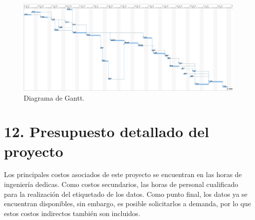 \documentclass[
11pt, %
]{charter}
\begin{document}
\begin{landscape}
  \centering
  \vspace*{\fill}
  \begin{figure}[htpb]
    \centering
    \includegraphics[height=.65\textheight]{./Figuras/gantt.jpg}
    \caption{Diagrama de Gantt.}
    \label{fig:diagGantt}
  \end{figure}
  \vfill
\end{landscape}


\section{12. Presupuesto detallado del proyecto}
\label{sec:presupuesto}

Los principales costos asociados de este proyecto se encuentran en las horas de ingeniería dedicas. Como costos secundarios, las horas de personal cualificado para la realización del etiquetado de los datos. Como punto final, los datos ya se encuentran disponibles, sin embargo, es posible solicitarlos a demanda, por lo que estos costos indirectos también son incluidos.
\end{document}
